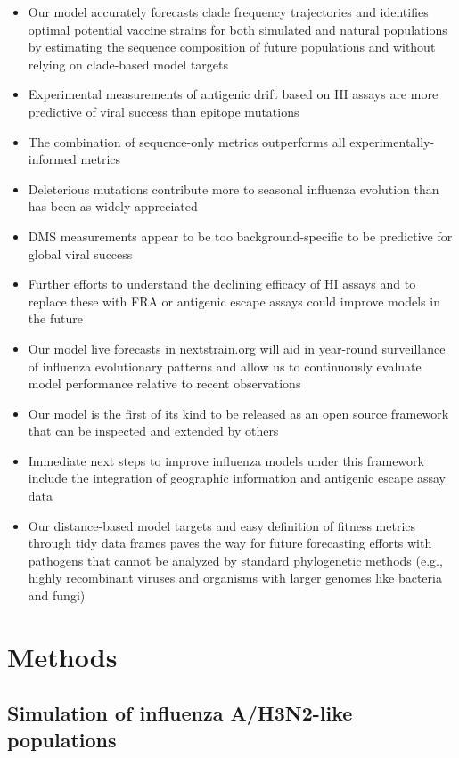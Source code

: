 \begin{itemize}
\item{Our model accurately forecasts clade frequency trajectories and identifies optimal potential vaccine strains for both simulated and natural populations by estimating the sequence composition of future populations and without relying on clade-based model targets}
\item{Experimental measurements of antigenic drift based on HI assays are more predictive of viral success than epitope mutations}
\item{The combination of sequence-only metrics outperforms all experimentally-informed metrics}
\item{Deleterious mutations contribute more to seasonal influenza evolution than has been as widely appreciated}
\item{DMS measurements appear to be too background-specific to be predictive for global viral success}
\item{Further efforts to understand the declining efficacy of HI assays and to replace these with FRA or antigenic escape assays could improve models in the future}
\item{Our model live forecasts in nextstrain.org will aid in year-round surveillance of influenza evolutionary patterns and allow us to continuously evaluate model performance relative to recent observations}
\item{Our model is the first of its kind to be released as an open source framework that can be inspected and extended by others}
\item{Immediate next steps to improve influenza models under this framework include the integration of geographic information and antigenic escape assay data}
\item{Our distance-based model targets and easy definition of fitness metrics through tidy data frames paves the way for future forecasting efforts with pathogens that cannot be analyzed by standard phylogenetic methods (e.g., highly recombinant viruses and organisms with larger genomes like bacteria and fungi)}
\end{itemize}

\section*{Methods}

\subsection*{Simulation of influenza A/H3N2-like populations}

